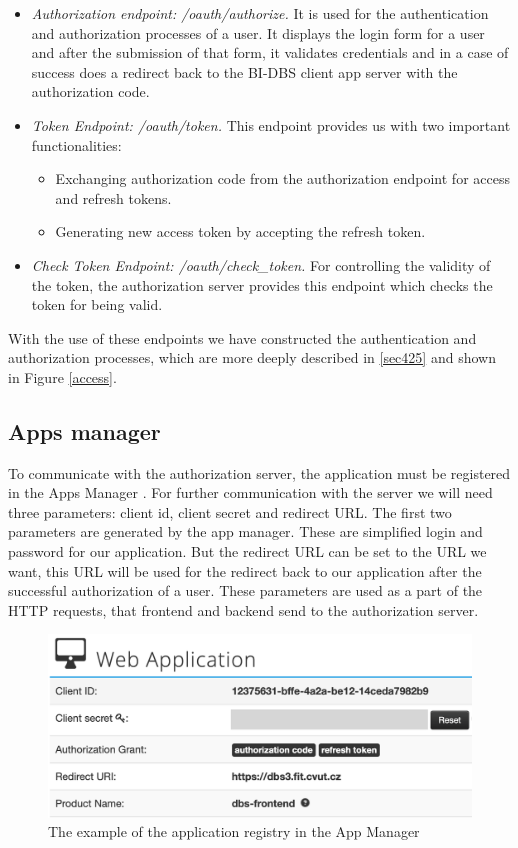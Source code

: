 \begin{itemize}
    \item \emph{Authorization endpoint: /oauth/authorize.} It is used for the authentication and authorization processes of a user. It displays the login form for a user and after the submission of that form, it validates credentials and in a case of success does a redirect back to the BI-DBS client app server with the authorization code. 
    \item \emph{Token Endpoint: /oauth/token.} This endpoint provides us with two important functionalities:
        \begin{itemize}
            \item Exchanging authorization code from the authorization endpoint for access and refresh tokens.
            \item Generating new access token by accepting the refresh token.
        \end{itemize}
   \item \emph{Check Token Endpoint: /oauth/check\_token.} For controlling the validity of the token, the authorization server provides this endpoint which checks the token for being valid.
\end{itemize}

\noindent With the use of these endpoints we have constructed the authentication and authorization processes, which are more deeply described in \ref{sec425} and shown in Figure \ref{access}.


\subsection{Apps manager} To communicate with the authorization server, the application must be registered in the Apps Manager \cite{app-manager}. For further communication with the server we will need three parameters: client id, client secret and redirect URL. The first two parameters are generated by the app manager. These are simplified login and password for our application. But the redirect URL can be set to the URL we want, this URL will be used for the redirect back to our application after the successful authorization of a user. These parameters are used as a part of the HTTP requests, that frontend and backend send to the authorization server. 

\begin{figure}[hp]
\centering
\includegraphics[scale=0.52]{../png/app_manager.png}
\caption{The example of the application registry in the App Manager \cite{app-manager}}
\label{appm}
\end{figure}



